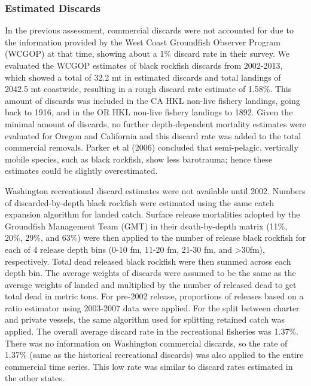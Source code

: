 \documentclass[11pt,
  english,
  letterpaper,
]{article}
\begin{document}
\hypertarget{estimated-discards}{%
\subsubsection{Estimated Discards}\label{estimated-discards}}

In the previous assessment, commercial discards were not accounted for due to the information provided by the West Coast Groundfish Observer Program (WCGOP) at that time, showing about a 1\% discard rate in their survey. We evaluated the WCGOP estimates of black rockfish discards from 2002-2013, which showed a total of 32.2 mt in estimated discards and total landings of 2042.5 mt coastwide, resulting in a rough discard rate estimate of 1.58\%. This amount of discards was included in the CA HKL non-live fishery landings, going back to 1916, and in the OR HKL non-live fishery landings to 1892. Given the minimal amount of discards, no further depth-dependent mortality estimates were evaluated for Oregon and California and this discard rate was added to the total commercial removals. Parker et al (2006) concluded that semi-pelagic, vertically mobile species, such as black rockfish, show less barotrauma; hence these estimates could be slightly overestimated.

Washington recreational discard estimates were not available until 2002. Numbers of discarded-by-depth black rockfish were estimated using the same catch expansion algorithm for landed catch. Surface release mortalities adopted by the Groundfish Management Team (GMT) in their death-by-depth matrix (11\%, 20\%, 29\%, and 63\%) were then applied to the number of release black rockfish for each of 4 release depth bins (0-10 fm, 11-20 fm, 21-30 fm, and \textgreater30fm), respectively. Total dead released black rockfish were then summed across each depth bin. The average weights of discards were assumed to be the same as the average weights of landed and multiplied by the number of released dead to get total dead in metric tons. For pre-2002 release, proportions of releases based on a ratio estimator using 2003-2007 data were applied. For the split between charter and private vessels, the same algorithm used for splitting retained catch was applied. The overall average discard rate in the recreational fisheries was 1.37\%. There was no information on Washington commercial discards, so the rate of 1.37\% (same as the historical recreational discards) was also applied to the entire commercial time series. This low rate was similar to discard rates estimated in the other states.
\end{document}
